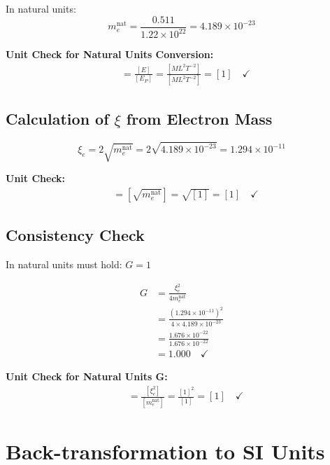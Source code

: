 \documentclass[12pt,a4paper]{article}
\theoremstyle{definition}
\begin{document}
	In natural units:
	\begin{equation}
		m_e^{\text{nat}} = \frac{0.511}{1.22 \times 10^{22}} = 4.189 \times 10^{-23}
	\end{equation}
	
	{\footnotesize
		\textbf{Unit Check for Natural Units Conversion:}
		\begin{align}
			[m_e^{\text{nat}}] &= \frac{[E]}{[E_P]} = \frac{[ML^2T^{-2}]}{[ML^2T^{-2}]} = [1] \quad \checkmark
		\end{align}
	}
	
	\subsection{Calculation of $\xi$ from Electron Mass}
	
	\begin{equation}
		\xi_e = 2\sqrt{m_e^{\text{nat}}} = 2\sqrt{4.189 \times 10^{-23}} = 1.294 \times 10^{-11}
	\end{equation}
	
	{\footnotesize
		\textbf{Unit Check:}
		\begin{align}
			[\xi_e] &= [\sqrt{m_e^{\text{nat}}}] = \sqrt{[1]} = [1] \quad \checkmark
		\end{align}
	}
	
	\subsection{Consistency Check}
	
	In natural units must hold: $G = 1$
	
	\begin{align}
		G &= \frac{\xi_e^2}{4m_e^{\text{nat}}}\\
		&= \frac{(1.294 \times 10^{-11})^2}{4 \times 4.189 \times 10^{-23}}\\
		&= \frac{1.676 \times 10^{-22}}{1.676 \times 10^{-22}}\\
		&= 1.000 \quad \checkmark
	\end{align}
	
	{\footnotesize
		\textbf{Unit Check for Natural Units G:}
		\begin{align}
			[G] &= \frac{[\xi_e^2]}{[m_e^{\text{nat}}]} = \frac{[1]^2}{[1]} = [1] \quad \checkmark
		\end{align}
	}
	
	\section{Back-transformation to SI Units}
	
\end{document}
